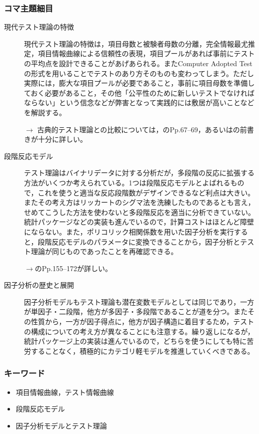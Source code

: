 \subsubsection{コマ主題細目}
\begin{description}
    \item[現代テスト理論の特徴]現代テスト理論の特徴は，項目母数と被験者母数の分離，完全情報最尤推定，項目情報曲線による信頼性の表現，項目プールがあれば事前にテストの平均点を設計できることがあげあられる。またComputer Adopted Testの形式を用いることでテストのあり方そのものも変わってしまう。ただし実際には，膨大な項目プールが必要であること，事前に項目母数を準備しておく必要があること，その他「公平性のために新しいテストでなければならない」という信念などが弊害となって実践的には敷居が高いことなどを解説する。

    \begin{flushright}
        $\to$ 古典的テスト理論との比較については，\citet{加藤健太郎2014-07-25}のPp.67--69，あるいは\citet{豊田秀樹2012-08-24}の前書きが十分に詳しい。
    \end{flushright}


    \item[段階反応モデル] テスト理論はバイナリデータに対する分析だが，多段階の反応に拡張する方法がいくつか考えられている。1つは段階反応モデルとよばれるもので，これを使うと適当な反応段階数がデザインできるなど利点は大きい。またその考え方はリッカートのシグマ法を洗練したものであるとも言え，せめてこうした方法を使わないと多段階反応を適当に分析できていない。統計パッケージなどの実装も進んでいるので，計算コストはほとんど障壁にならない。また，ポリコリック相関係数を用いた因子分析を実行すると，段階反応モデルのパラメータに変換できることから，因子分析とテスト理論が同じものであったことを再確認できる。

    \begin{flushright}
        $\to$\citet{豊田秀樹2012-08-24}のPp.155--172が詳しい。
    \end{flushright}
    
    \item[因子分析の歴史と展開]  因子分析モデルもテスト理論も潜在変数モデルとしては同じであり，一方が単因子・二段階，他方が多因子・多段階であることが道を分つ。またその性質から，一方が因子得点に，他方が因子構造に着目するため，テストの構成についての考え方が異なることにも注意する。繰り返しになるが，統計パッケージ上の実装は進んでいるので，どちらを使うにしても特に苦労することなく，積極的にカテゴリ軽モデルを推進していくべきである。
\end{description}
\subsubsection{キーワード}
\begin{itemize}
\item 項目情報曲線，テスト情報曲線
\item 段階反応モデル
\item 因子分析モデルとテスト理論
\end{itemize}
